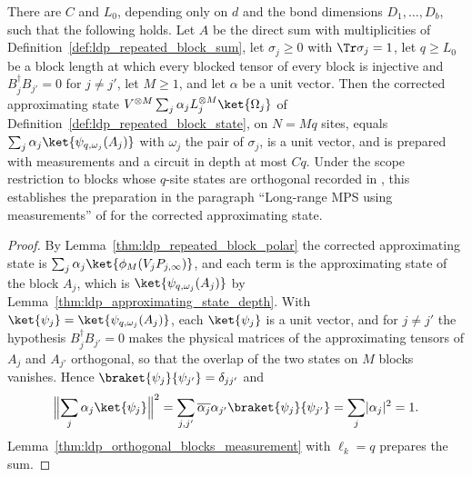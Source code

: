 \begin{lemma}
    \label{thm:ldp_repeated_block_measurement}
    \leanok
    There are $C$ and $L_0$, depending only on $d$ and the bond dimensions
    $D_1,\dots,D_b$, such that the following holds. Let $A$ be the direct sum
    with multiplicities of Definition~\ref{def:ldp_repeated_block_sum}, let
    $\sigma_j\geq0$ with $\Tr\sigma_j=1$, let $q\geq L_0$ be a block length at
    which every blocked tensor of every block is injective and
    $B_j^\dagger B_{j'}=0$ for $j\neq j'$, let $M\geq1$, and let $\alpha$ be a
    unit vector. Then the corrected approximating state
    $V^{\otimes M}\sum_j\alpha_jL_j^{\otimes M}\ket{\Omega_j}$ of
    Definition~\ref{def:ldp_repeated_block_state}, on $N=Mq$ sites, equals
    $\sum_j\alpha_j\ket{\psi_{q,\omega_j}(A_j)}$ with $\omega_j$ the pair of
    $\sigma_j$, is a unit vector, and is prepared with measurements and a
    circuit in depth at most $Cq$. Under the scope restriction to blocks whose
    $q$-site states are orthogonal recorded in
    \cite{gap:mswc24_block_form_mixed_overlap,gap:mswc24_repeated_block_corrected_state},
    this establishes the preparation in the paragraph ``Long-range MPS using
    measurements'' of \cite{Malz2024Preparation} for the corrected
    approximating state.
\end{lemma}
\begin{proof}
    \leanok
    By Lemma~\ref{thm:ldp_repeated_block_polar} the corrected approximating
    state is $\sum_j\alpha_j\ket{\phi_M(V_jP_{j,\infty})}$, and each term is the
    approximating state of the block $A_j$, which is
    $\ket{\psi_{q,\omega_j}(A_j)}$ by
    Lemma~\ref{thm:ldp_approximating_state_depth}. With
    $\ket{\psi_j}=\ket{\psi_{q,\omega_j}(A_j)}$, each $\ket{\psi_j}$ is a unit
    vector, and for $j\neq j'$ the hypothesis $B_j^\dagger B_{j'}=0$ makes the
    physical matrices of the approximating tensors of $A_j$ and $A_{j'}$
    orthogonal, so that the overlap of the two states on $M$ blocks vanishes.
    Hence $\braket{\psi_j}{\psi_{j'}}=\delta_{jj'}$ and
    \begin{align}
        \Bigl\lVert\sum_j\alpha_j\ket{\psi_j}\Bigr\rVert^2
        =\sum_{j,j'}\overline{\alpha_j}\alpha_{j'}\braket{\psi_j}{\psi_{j'}}
        =\sum_j\lvert\alpha_j\rvert^2=1.
        \notag
    \end{align}
    Lemma~\ref{thm:ldp_orthogonal_blocks_measurement} with $\ell_k=q$
    prepares the sum.
\end{proof}

